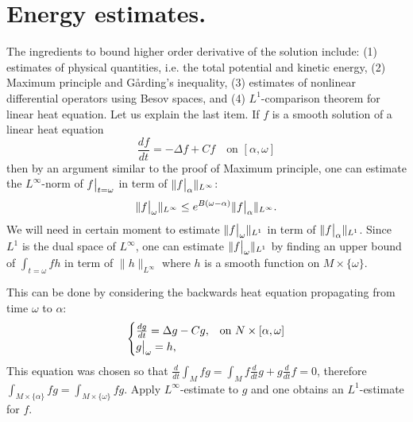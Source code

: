 \section{Energy estimates.}
\label{sec:orgded6fed}
The ingredients to bound higher order derivative of the solution include: (1) estimates of
physical quantities, i.e. the total potential and kinetic energy, (2) Maximum principle
and  Gårding's inequality, (3) estimates of nonlinear differential operators using Besov
spaces, and (4) \(L^1\)-comparison theorem for linear heat equation. Let us explain the
last item. If \(f\) is a smooth solution of a linear heat equation
\[
 \frac{df}{dt} = -\Delta f + Cf \quad \text{on } [\alpha,\omega]
\]
then by an argument similar to the proof of Maximum principle, one can estimate the \(L^\infty\)-norm of \(\restr{f}{t=\omega}\) in term of \(\|\restr{f}{\alpha}\|_{L^\infty}\):
\[
 \|\restr{f}{\omega}\|_{L^\infty} \leq e^{B(\omega-\alpha)}
\|\restr{f}{\alpha}\|_{L^\infty}.
\]
We will need in certain moment to estimate \(\|\restr{f}{\omega}\|_{L^1}\) in term of \(\|\restr{f}{\alpha} \|_{L^1}\). Since \(L^1\) is the dual space of \(L^\infty\), one
can estimate \(\|\restr{f}{\omega}\|_{L^1}\) by finding an upper bound of \(\int_{t=\omega} fh\) in term of \(\|h\|_{L^\infty}\) where \(h\) is a smooth function
on \(M\times\{\omega\}\).

This can be done by considering the backwards heat equation propagating from time \(\omega\) to \(\alpha\): 
\begin{equation*}
 \begin{cases}
\frac{d g}{dt} = \Delta g - C g,  & \text{on $ N\times{[\alpha,\omega]}$} \\
\restr{g}{\omega} = h, 
\end{cases}
\end{equation*}
This equation was chosen so that \(\frac{d}{dt}\int_M fg = \int_M f \frac{d }{dt}g + g
\frac{d }{dt}f =0\), therefore \(\int_{M\times\{\alpha\}}fg = \int_{M\times\{\omega\}} fg\). Apply \(L^\infty\)-estimate to \(g\) and one obtains an \(L^1\)-estimate for \(f\).